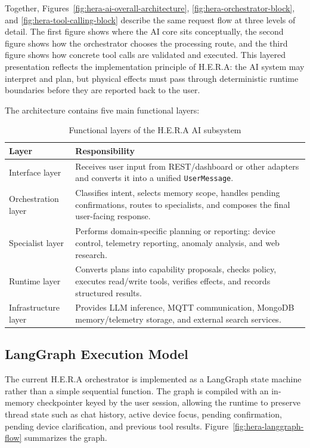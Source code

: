 Together, Figures~\ref{fig:hera-ai-overall-architecture}, \ref{fig:hera-orchestrator-block}, and \ref{fig:hera-tool-calling-block} describe the same request flow at three levels of detail. The first figure shows where the AI core sits conceptually, the second figure shows how the orchestrator chooses the processing route, and the third figure shows how concrete tool calls are validated and executed. This layered presentation reflects the implementation principle of H.E.R.A: the AI system may interpret and plan, but physical effects must pass through deterministic runtime boundaries before they are reported back to the user.

The architecture contains five main functional layers:

\begin{table}[H]
    \centering
    \caption{Functional layers of the H.E.R.A AI subsystem}
    \label{tab:hera-ai-layers}
    \renewcommand{\arraystretch}{1.2}
    \begin{tabularx}{\textwidth}{@{}p{3.1cm}X@{}}
        \toprule
        \textbf{Layer} & \textbf{Responsibility} \\
        \midrule
        Interface layer & Receives user input from REST/dashboard or other adapters and converts it into a unified \texttt{UserMessage}. \\
        Orchestration layer & Classifies intent, selects memory scope, handles pending confirmations, routes to specialists, and composes the final user-facing response. \\
        Specialist layer & Performs domain-specific planning or reporting: device control, telemetry reporting, anomaly analysis, and web research. \\
        Runtime layer & Converts plans into capability proposals, checks policy, executes read/write tools, verifies effects, and records structured results. \\
        Infrastructure layer & Provides LLM inference, MQTT communication, MongoDB memory/telemetry storage, and external search services. \\
        \bottomrule
    \end{tabularx}
\end{table}

\subsection{LangGraph Execution Model}

The current H.E.R.A orchestrator is implemented as a LangGraph state machine rather than a simple sequential function. The graph is compiled with an in-memory checkpointer keyed by the user session, allowing the runtime to preserve thread state such as chat history, active device focus, pending confirmation, pending device clarification, and previous tool results. Figure~\ref{fig:hera-langgraph-flow} summarizes the graph.

